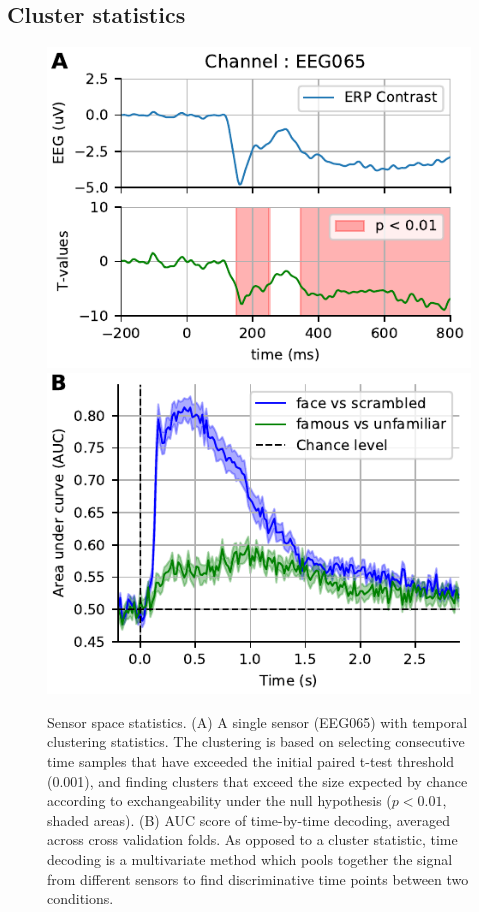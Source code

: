 \subsection{Cluster statistics}

\begin{figure}
\centering
    \includegraphics[width=0.49\linewidth]{figures/sensorstat_highpass-NoneHz.pdf}
    \includegraphics[width=0.49\linewidth]{figures/time_decoding_highpass-NoneHz.pdf}
    \caption[Sensor space statistics.]{Sensor space statistics. (A) A single sensor (EEG065) with temporal clustering statistics. The clustering is based on selecting consecutive time samples that have exceeded the initial paired t-test threshold (0.001), and finding clusters that exceed the size expected by chance according to exchangeability under the null hypothesis ($p < 0.01$, shaded areas). (B) AUC score of time-by-time decoding, averaged across cross validation folds. As opposed to a cluster statistic, time decoding is a multivariate method which pools together the signal from different sensors to find discriminative time points between two conditions.}
\label{fig:fig_sensorstat}
\end{figure}

